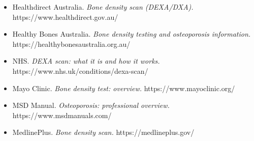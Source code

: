 \begin{itemize}
    \item Healthdirect Australia. \textit{Bone density scan (DEXA/DXA).} https://www.healthdirect.gov.au/
    \item Healthy Bones Australia. \textit{Bone density testing and osteoporosis information.} https://healthybonesaustralia.org.au/
    \item NHS. \textit{DEXA scan: what it is and how it works.} https://www.nhs.uk/conditions/dexa-scan/
    \item Mayo Clinic. \textit{Bone density test: overview.} https://www.mayoclinic.org/
    \item MSD Manual. \textit{Osteoporosis: professional overview.} https://www.msdmanuals.com/
    \item MedlinePlus. \textit{Bone density scan.} https://medlineplus.gov/
\end{itemize}
